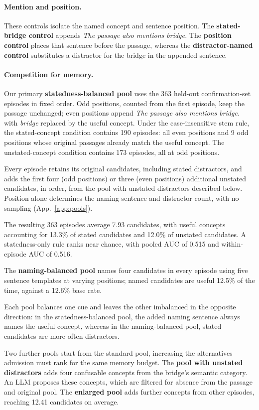 \paragraph{Mention and position.}
These controls isolate the named concept and sentence position.
The \textbf{stated-bridge control} appends \emph{The passage also
mentions bridge.} The \textbf{position control} places that sentence
before the passage, whereas the \textbf{distractor-named control}
substitutes a distractor for the bridge in the appended sentence.

\paragraph{Competition for memory.}
Our primary \textbf{statedness-balanced pool} uses the 363 held-out
confirmation-set episodes in fixed order. Odd positions, counted from
the first episode, keep the passage unchanged; even positions append
\emph{The passage also mentions bridge.} with \emph{bridge} replaced
by the useful concept. Under the case-insensitive stem rule, the
stated-concept condition contains 190 episodes: all even positions
and 9 odd positions whose original passages already match the useful
concept. The unstated-concept condition contains 173 episodes, all
at odd positions.

Every episode retains its original candidates, including stated
distractors, and adds the first four (odd positions) or three (even
positions) additional unstated candidates, in order, from the pool
with unstated distractors described below. Position alone determines
the naming sentence and distractor count, with no sampling
(App.~\ref{app:pools}).

The resulting 363 episodes average 7.93 candidates, with useful
concepts accounting for 13.3\% of stated candidates and 12.0\% of
unstated candidates. A statedness-only rule ranks near chance, with
pooled AUC of 0.515 and within-episode AUC of 0.516.

The \textbf{naming-balanced pool} names four candidates in every
episode using five sentence templates at varying positions; named
candidates are useful 12.5\% of the time, against a 12.6\% base rate.

Each pool balances one cue and leaves the other imbalanced in the
opposite direction: in the statedness-balanced pool, the added naming
sentence always names the useful concept, whereas in the
naming-balanced pool, stated candidates are more often distractors.

Two further pools start from the standard pool, increasing the
alternatives admission must rank for the same memory budget.
The \textbf{pool with unstated distractors} adds four confusable
concepts from the bridge's semantic category. An LLM proposes these
concepts, which are filtered for absence from the passage and
original pool. The \textbf{enlarged pool} adds further concepts from
other episodes, reaching 12.41 candidates on average.

